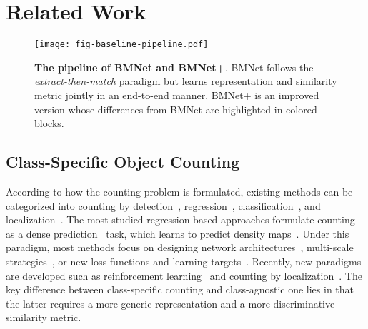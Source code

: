 \documentclass[10pt,twocolumn,letterpaper]{article}
\begin{document}
\section{Related Work}
\begin{figure*}[!t]
  \centering
   \texttt{[image: fig-baseline-pipeline.pdf]}\vspace{-5pt}
   \caption{\textbf{The pipeline of BMNet and BMNet+}. BMNet follows the \textit{extract-then-match} paradigm but learns representation and similarity metric jointly in an end-to-end manner. BMNet+ is an improved version whose differences from BMNet are highlighted in colored blocks.}
   \label{fig:baseline-pipeline}
   \vspace{-5pt}
\end{figure*}

\subsection{Class-Specific Object Counting}
According to how the counting problem is formulated, existing methods can be categorized into counting by detection~\cite{counting_by_detection}, regression~\cite{count_by_regression, zhang_2015_CVPR, zhang2016singleMCNN, dmcount}, classification~\cite{bcnet}, and localization~\cite{d2cnet, p2pnet, topocount}.
The most-studied regression-based approaches formulate counting as a dense prediction~\cite{indexnet, indexnet_pami} task, which learns to predict density maps~\cite{density_map}. Under this paradigm, most methods focus on designing network architectures~\cite{zhang2016singleMCNN}, multi-scale strategies~\cite{sdcnet, sasnet}, or new loss functions and learning targets~\cite{dmcount, bloss}. Recently, new paradigms are developed such as reinforcement learning~\cite{libranet} and counting by localization~\cite{topocount, d2cnet, p2pnet}. The key difference between class-specific counting and class-agnostic one lies in that the latter requires a more generic representation and a more discriminative similarity metric. 
\end{document}
